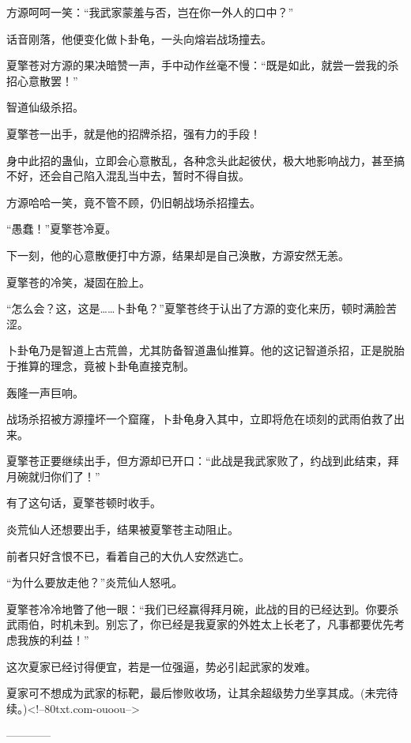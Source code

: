 \begin{this_body}
方源呵呵一笑：“我武家蒙羞与否，岂在你一外人的口中？”

话音刚落，他便变化做卜卦龟，一头向熔岩战场撞去。

夏擎苍对方源的果决暗赞一声，手中动作丝毫不慢：“既是如此，就尝一尝我的杀招心意散罢！”

智道仙级杀招。

夏擎苍一出手，就是他的招牌杀招，强有力的手段！

身中此招的蛊仙，立即会心意散乱，各种念头此起彼伏，极大地影响战力，甚至搞不好，还会自己陷入混乱当中去，暂时不得自拔。

方源哈哈一笑，竟不管不顾，仍旧朝战场杀招撞去。

“愚蠢！”夏擎苍冷夏。

下一刻，他的心意散便打中方源，结果却是自己涣散，方源安然无恙。

夏擎苍的冷笑，凝固在脸上。

“怎么会？这，这是……卜卦龟？”夏擎苍终于认出了方源的变化来历，顿时满脸苦涩。

卜卦龟乃是智道上古荒兽，尤其防备智道蛊仙推算。他的这记智道杀招，正是脱胎于推算的理念，竟被卜卦龟直接克制。

轰隆一声巨响。

战场杀招被方源撞坏一个窟窿，卜卦龟身入其中，立即将危在顷刻的武雨伯救了出来。

夏擎苍正要继续出手，但方源却已开口：“此战是我武家败了，约战到此结束，拜月碗就归你们了！”

有了这句话，夏擎苍顿时收手。

炎荒仙人还想要出手，结果被夏擎苍主动阻止。

前者只好含恨不已，看着自己的大仇人安然逃亡。

“为什么要放走他？”炎荒仙人怒吼。

夏擎苍冷冷地瞥了他一眼：“我们已经赢得拜月碗，此战的目的已经达到。你要杀武雨伯，时机未到。别忘了，你已经是我夏家的外姓太上长老了，凡事都要优先考虑我族的利益！”

这次夏家已经讨得便宜，若是一位强逼，势必引起武家的发难。

夏家可不想成为武家的标靶，最后惨败收场，让其余超级势力坐享其成。(未完待续。)<!--80txt.com-ouoou-->

------------

\end{this_body}

